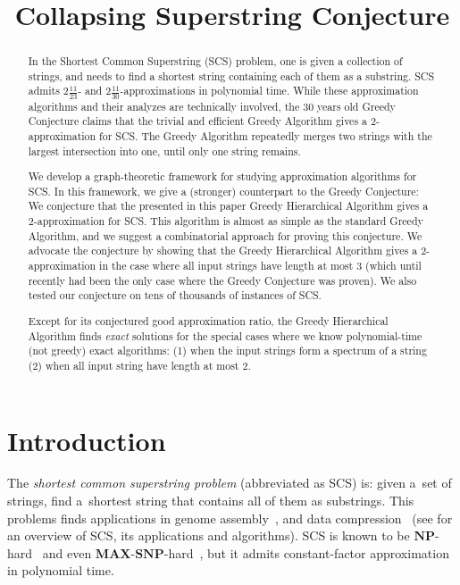 \documentclass[11pt]{article}
\begin{document}
%

\sloppy
\date{}
\title{Collapsing Superstring Conjecture}
\author{}
\maketitle

\begin{abstract}
In the Shortest Common Superstring (SCS) problem, one is given a collection of strings, and needs to find a shortest string containing each of them as a substring. SCS admits $2\frac{11}{23}$- and $2\frac{11}{30}$-approximations in polynomial time. While these approximation algorithms and their analyzes are technically involved, the $30$ years old Greedy Conjecture claims that the trivial and efficient Greedy Algorithm gives a $2$-approximation for SCS. The Greedy Algorithm repeatedly merges two strings with the largest intersection into one, until only one string remains.

We develop a graph-theoretic framework for studying approximation algorithms for SCS. In this framework, we give a (stronger) counterpart to the Greedy Conjecture: We conjecture that the presented in this paper Greedy Hierarchical Algorithm gives a $2$-approximation for SCS. This algorithm is almost as simple as the standard Greedy Algorithm, and we suggest a combinatorial approach for proving this conjecture. We advocate the conjecture by showing that the Greedy Hierarchical Algorithm gives a $2$-approximation in the case where all input strings have length at most $3$ (which until recently had been the only case where the Greedy Conjecture was proven). We also tested our conjecture on tens of thousands of instances of SCS.

Except for its conjectured good approximation ratio, the Greedy Hierarchical Algorithm finds \emph{exact} solutions for the special cases where we know polynomial-time (not greedy) exact algorithms: (1) when the input strings form a spectrum of a string (2) when all input string have length at most $2$.
\end{abstract}


\section{Introduction}
The {\em shortest common superstring problem} (abbreviated as SCS) is:
given a~set of strings, find a~shortest string that contains all of them as
substrings. This problems finds applications in genome assembly~\cite{waterman1995introduction, pevzner2001eulerian}, and data compression~\cite{GMS1980, phdthesis, storer1987data} (see \cite{gevezes2014shortest, mucha2007tutorial} for an overview of SCS, its applications and algorithms).  SCS is known to be $\mathbf{NP}$-hard~\cite{GMS1980} and even $\mathbf{MAX}$-$\mathbf{SNP}$-hard~\cite{BJLTY1991}, but it admits constant-factor approximation in polynomial time.
\end{document}
